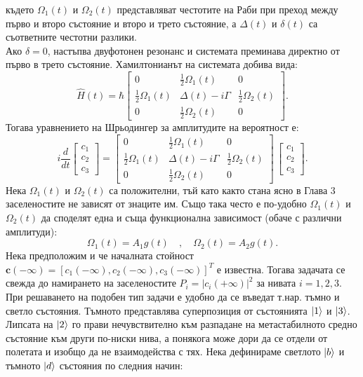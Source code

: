     където $\Omega_1(t)$ и $\Omega_2(t)$ представляват честотите на Раби при преход между първо и второ състояние и второ и трето състояние, а
    $\Delta(t)$ и $\delta(t)$ са съответните честотни разлики.\\
    Ако $\delta = 0$, настъпва двуфотонен резонанс и системата преминава директно от първо в трето състояние. Хамилтонианът на системата добива вида:
    \begin{equation}
        \hat{H}(t) = \hbar
        \begin{bmatrix}
            0 & \frac{1}{2}\Omega_1(t) & 0 \\
            \frac{1}{2}\Omega_1(t) & \Delta(t)-\textit{i}\Gamma & \frac{1}{2}\Omega_2(t) \\
            0 & \frac{1}{2}\Omega_2(t) & 0
        \end{bmatrix}.
    \end{equation}
    Тогава уравнението на Шрьодингер за амплитудите на вероятност е:
    \begin{equation} \label{5.3}
        \textit{i}\frac{d}{dt}\begin{bmatrix}
            c_1\\
            c_2\\
            c_3
        \end{bmatrix} = \begin{bmatrix}
            0 & \frac{1}{2}\Omega_1(t) & 0 \\
            \frac{1}{2}\Omega_1(t) & \Delta(t)-\textit{i}\Gamma & \frac{1}{2}\Omega_2(t) \\
            0 & \frac{1}{2}\Omega_2(t) & 0
        \end{bmatrix} \, \begin{bmatrix}
            c_1\\
            c_2\\
            c_3
        \end{bmatrix}.
    \end{equation}
    Нека $\Omega_1(t)$ и $\Omega_2(t)$ са положителни, тъй като както стана ясно в Глава 3 заселеностите не зависят от знаците им. Също така често е по-удобно $\Omega_1(t)$ и
    $\Omega_2(t)$ да споделят една и съща функционална зависимост (обаче с различни амплитуди):
    \begin{equation} \label{5.4}
        \Omega_1(t) = A_1g(t) \quad , \quad \Omega_2(t) = A_2g(t).
    \end{equation}
    Нека предположим и че началната стойност $\textbf{c}(-\infty) = [c_1(-\infty), c_2(-\infty), c_3(-\infty)]^T$ е известна. Тогава задачата се свежда до намирането на
    заселеностите $P_\textit{i} = \left|c_\textit{i}(+\infty)\right|^2$ за нивата $\textit{i} = 1, 2, 3$.\\
    При решаването на подобен тип задачи е удобно да се въведат т.нар. тъмно и светло състояния. Тъмното представлява суперпозиция от състоянията $\ket{1}$ и $\ket{3}$. Липсата
    на $\ket{2}$ го прави нечувствително към разпадане на метастабилното средно състояние към други по-ниски нива, а понякога може дори да се отдели от полетата и изобщо да не
    взаимодейства с тях. Нека дефинираме светлото $\ket{b}$ и тъмното $\ket{d}$ състояния по следния начин:

